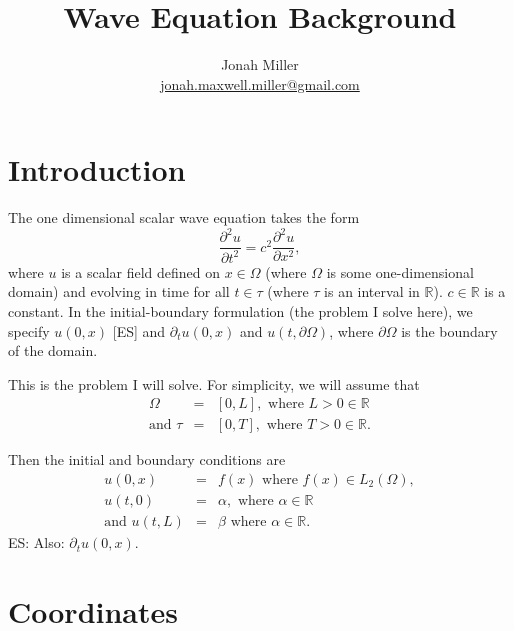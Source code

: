 \documentclass[]{article}
\author{Jonah Miller\\
  \href{mailto:jonah.maxwell.miller@gmail.com}{jonah.maxwell.miller@gmail.com}}
\title{Wave Equation Background}
\newcommand{\R}{\mathbb{R}}
\begin{document}
\maketitle

\section{Introduction}

The one dimensional scalar wave equation takes the form
\begin{equation}
  \label{eq:1d:wave}
  \frac{\partial^2 u}{\partial t^2} = c^2 \frac{\partial^2 u}{\partial x^2},
\end{equation}
where $u$ is a scalar field defined on $x\in\Omega$ (where $\Omega$ is
some one-dimensional domain) and evolving in time for all $t\in\tau$
(where $\tau$ is an interval in $\R$). $c\in\R$ is a constant. In the
initial-boundary formulation (the problem I solve here), we specify
$u(0,x)$
[ES] and $\partial_t u(0,x)$
and $u(t,\partial\Omega)$, where $\partial\Omega$ is the
boundary of the domain.

This is the problem I will solve. For simplicity, we will assume that
\begin{eqnarray}
  \label{eq:domains}
  \Omega &=& [0,L],\text{ where }L>0\in\R\\
  \text{and }\tau &=& [0,T],\text{ where }T>0\in\R.
\end{eqnarray}

Then the initial and boundary conditions are
\begin{eqnarray}
  \label{eq:initial:boundary:data}
  u(0,x) &=& f(x)\text{ where }f(x) \in L_2(\Omega),\\
  u(t,0) &=& \alpha,\text{ where }\alpha\in\R\\
  \text{and }u(t,L)&=&\beta\text{ where }\alpha\in\R.
\end{eqnarray}
ES: Also: $\partial_t u(0,x)$.

\section{Coordinates}
\end{document}
